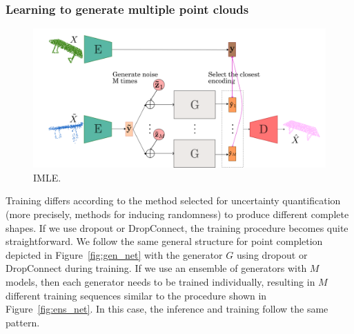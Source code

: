         \subsubsection{Learning to generate multiple point clouds}
        \begin{figure}[htb]
          \begin{center}
          \includegraphics[width=\linewidth]{figures/implicit_gen_network_imle.png}
          \end{center}
          \caption{IMLE.}\label{fig:imle}
        \end{figure}
        Training differs according to the method selected for uncertainty quantification (more precisely, methods for inducing randomness) to produce different complete shapes. If we use dropout or DropConnect, the training procedure becomes quite straightforward. We follow the same general structure for point completion depicted in Figure~\ref{fig:gen_net} with the generator $G$ using dropout or DropConnect during training. If we use an ensemble of generators with $M$ models, then each generator needs to be trained individually, resulting in $M$ different training sequences similar to the procedure shown in Figure~\ref{fig:ens_net}. In this case, the inference and training follow the same pattern. 
        
